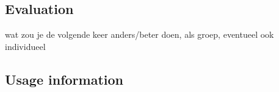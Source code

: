 
\subsection{Evaluation}
wat zou je de volgende keer anders/beter doen, als groep, eventueel ook individueel

\subsection{Usage information}
